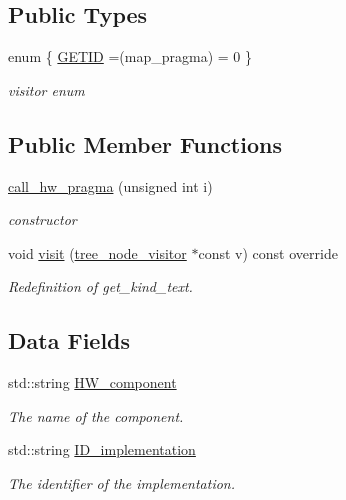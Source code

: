 \subsection*{Public Types}
\begin{DoxyCompactItemize}
\item 
enum \{ \hyperlink{structcall__hw__pragma_ae4af9d5c3a7b842647e704eb6ce1c975a1f6b88f0f5294c33a0fa20333fd9d101}{G\+E\+T\+ID} =(map\+\_\+pragma) = 0
 \}\begin{DoxyCompactList}\small\item\em visitor enum \end{DoxyCompactList}
\end{DoxyCompactItemize}
\subsection*{Public Member Functions}
\begin{DoxyCompactItemize}
\item 
\hyperlink{structcall__hw__pragma_aed96e36650fe30408ca38cc1d1bde892}{call\+\_\+hw\+\_\+pragma} (unsigned int i)
\begin{DoxyCompactList}\small\item\em constructor \end{DoxyCompactList}\item 
void \hyperlink{structcall__hw__pragma_a7ad2f9a214388ac8de0806ff6c8db2bc}{visit} (\hyperlink{classtree__node__visitor}{tree\+\_\+node\+\_\+visitor} $\ast$const v) const override
\begin{DoxyCompactList}\small\item\em Redefinition of get\+\_\+kind\+\_\+text. \end{DoxyCompactList}\end{DoxyCompactItemize}
\subsection*{Data Fields}
\begin{DoxyCompactItemize}
\item 
std\+::string \hyperlink{structcall__hw__pragma_a5dac433f53d27b6afb9ddc9d1022b9fa}{H\+W\+\_\+component}
\begin{DoxyCompactList}\small\item\em The name of the component. \end{DoxyCompactList}\item 
std\+::string \hyperlink{structcall__hw__pragma_a420eeea869b9623157a768639e631224}{I\+D\+\_\+implementation}
\begin{DoxyCompactList}\small\item\em The identifier of the implementation. \end{DoxyCompactList}\end{DoxyCompactItemize}
